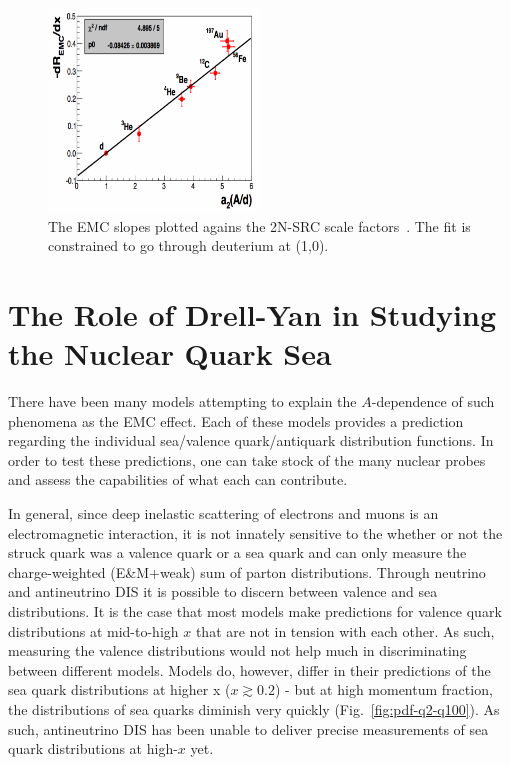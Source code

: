 \begin{figure}
	\centering
	\includegraphics[width=0.5\textwidth]{figures/background/emc-a2.png}
	\caption{The EMC slopes plotted agains the 2N-SRC scale factors~\cite{Hen:2012fm}. The fit is constrained to go through deuterium at (1,0).}
	\label{fig:emc-a2}
\end{figure}

\section{The Role of Drell-Yan in Studying the Nuclear Quark Sea} \label{sec:dy-emc-sea}

There have been many models attempting to explain the $A$-dependence of such phenomena as the EMC effect. Each of these models provides a prediction regarding the individual sea/valence quark/antiquark distribution functions. In order to test these predictions, one can take stock of the many nuclear probes and assess the capabilities of what each can contribute.

In general, since deep inelastic scattering of electrons and muons is an electromagnetic interaction, it is not innately sensitive to the whether or not the struck quark was a valence quark or a sea quark and can only measure the charge-weighted (E\&M+weak) sum of parton distributions. Through neutrino and antineutrino DIS it is possible to discern between valence and sea distributions. It is the case that most models make predictions for valence quark distributions at mid-to-high $x$ that are not in tension with each other. As such, measuring the valence distributions would not help much in discriminating between different models. Models do, however, differ in their predictions of the sea quark distributions at higher x ($x\gtrsim0.2$) - but at high momentum fraction, the distributions of sea quarks diminish very quickly (Fig.~\ref{fig:pdf-q2-q100}). As such, antineutrino DIS has been unable to deliver precise measurements of sea quark distributions at high-$x$ yet.

